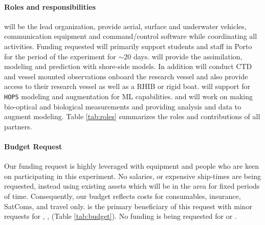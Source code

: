\paragraph{Roles and responsibilities} \univ will be the lead
organization, provide aerial, surface and underwater vehicles,
communication equipment and command/control software while
coordinating all activities. Funding requested will primarily support
students and staff in Porto for the period of the experiment for
$\sim 20$ days. \inst will provide the assimilation, modeling and
prediction with shore-side models. In addition \inst will conduct CTD
and vessel mounted observations onboard the research vessel and also
provide access to their research vessel as well as a RHIB or rigid
boat. \mit will support \inst for \texttt{HOPS} modeling and
augmentation for ML capabilities. \colo and \ave will work on making
bio-optical and biological measurements and providing analysis and
data to augment \inst modeling. Table \ref{tab:roles} summarizes the
roles and contributions of all partners.

\paragraph{Budget Request} Our funding request is highly leveraged
with equipment and people who are keen on participating in this
experiment. No salaries, or expensive ship-times are being requested,
instead using existing assets which will be in the \naz area for fixed
periods of time. Consequently, our budget reflects costs for
consumables, insurance, SatComs, and travel only. \univ is the primary
beneficiary of this request with minor requests for \inste, \avee,
\colo (Table \ref{tab:budget}). No funding is being requested for
\mit or \soce.

